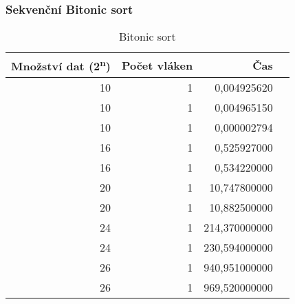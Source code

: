 \documentclass[12pt]{article}
\begin{document}
\subsubsection{Sekvenční Bitonic sort}
\begin{table}[H]
\begin{center}
\begin{tabular}{|r|r|r|r|}
\hline Množství dat (2\textsuperscript{n}) & Počet vláken & Čas \\ \hline
10  & 1 & 0,004925620 \\ \hline
10  & 1 & 0,004965150 \\ \hline
10  & 1 & 0,000002794 \\ \hline
16  & 1 & 0,525927000 \\ \hline
16  & 1 & 0,534220000 \\ \hline
20  & 1 & 10,747800000 \\ \hline
20  & 1 & 10,882500000 \\ \hline
24  & 1 & 214,370000000 \\ \hline
24  & 1 & 230,594000000 \\ \hline
26  & 1 & 940,951000000 \\ \hline
26  & 1 & 969,520000000 \\ \hline
\end{tabular} 
\end{center}
\caption{Bitonic sort}
\end{table}
\end{document}
